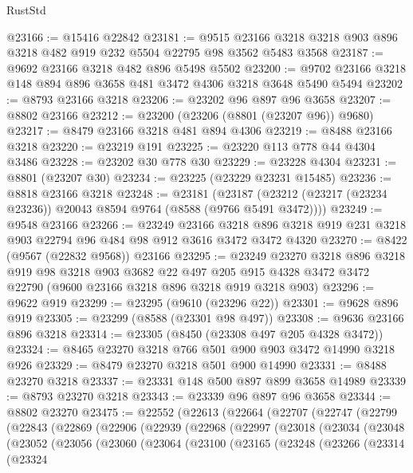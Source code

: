 \begin{lexlean}{RustStd}
\begin{coremodule}
@23166 := @15416 @22842
@23181 := @9515 @23166 @3218 @3218 @903 @896 @3218 @482 @919 @232 @5504 @22795 @98 @3562 @5483 @3568
@23187 := @9692 @23166 @3218 @482 @896 @5498 @5502
@23200 := @9702 @23166 @3218 @148 @894 @896 @3658 @481 @3472 @4306 @3218 @3648 @5490 @5494
@23202 := @8793 @23166 @3218
@23206 := @23202 @96 @897 @96 @3658
@23207 := @8802 @23166
@23212 := @23200 (@23206 (@8801 (@23207 @96)) @9680)
@23217 := @8479 @23166 @3218 @481 @894 @4306
@23219 := @8488 @23166 @3218
@23220 := @23219 @191
@23225 := @23220 @113 @778 @44 @4304 @3486
@23228 := @23202 @30 @778 @30
@23229 := @23228 @4304
@23231 := @8801 (@23207 @30)
@23234 := @23225 (@23229 @23231 @15485)
@23236 := @8818 @23166 @3218
@23248 := @23181
    (@23187 (@23212 (@23217 (@23234 @23236)) @20043 @8594 @9764 (@8588 (@9766 @5491 @3472))))
@23249 := @9548 @23166
@23266 := @23249
    @23166
    @3218
    @896
    @3218
    @919
    @231
    @3218
    @903
    @22794
    @96
    @484
    @98
    @912
    @3616
    @3472
    @3472
    @4320
@23270 := @8422 (@9567 (@22832 @9568)) @23166
@23295 := @23249
    @23270
    @3218
    @896
    @3218
    @919
    @98
    @3218
    @903
    @3682
    @22
    @497
    @205
    @915
    @4328
    @3472
    @3472
    @22790
    (@9600 @23166 @3218 @896 @3218 @919 @3218 @903)
@23296 := @9622 @919
@23299 := @23295 (@9610 (@23296 @22))
@23301 := @9628 @896 @919
@23305 := @23299 (@8588 (@23301 @98 @497))
@23308 := @9636 @23166 @896 @3218
@23314 := @23305 (@8450 (@23308 @497 @205 @4328 @3472))
@23324 := @8465 @23270 @3218 @766 @501 @900 @903 @3472 @14990 @3218 @926
@23329 := @8479 @23270 @3218 @501 @900 @14990
@23331 := @8488 @23270 @3218
@23337 := @23331 @148 @500 @897 @899 @3658 @14989
@23339 := @8793 @23270 @3218
@23343 := @23339 @96 @897 @96 @3658
@23344 := @8802 @23270
@23475 := @22552
    (@22613
      (@22664
        (@22707
          (@22747
            (@22799
              (@22843
                (@22869
                  (@22906
                    (@22939
                      (@22968
                        (@22997
                          (@23018
                            (@23034
                              (@23048
                                (@23052
                                  (@23056
                                    (@23060
                                      (@23064
                                        (@23100
                                          (@23165
                                            (@23248
                                              (@23266
                                                (@23314
                                                  (@23324

\end{coremodule}
\end{lexlean}
